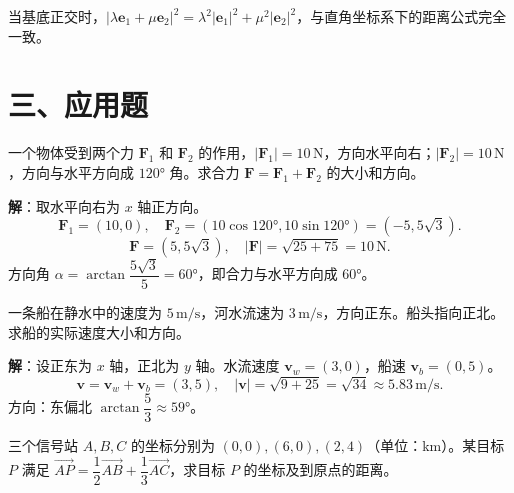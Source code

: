 \documentclass[12pt, a4paper]{ctexart}
\begin{document}
\begin{tipbox}[规律总结]
当基底正交时，$|\lambda\boldsymbol{e}_1+\mu\boldsymbol{e}_2|^2=\lambda^2|\boldsymbol{e}_1|^2+\mu^2|\boldsymbol{e}_2|^2$，与直角坐标系下的距离公式完全一致。
\end{tipbox}

\section*{\textcolor{apppurple}{三、应用题}}

\begin{appbox}[【应用1】力学中的向量分解]
一个物体受到两个力 $\boldsymbol{F}_1$ 和 $\boldsymbol{F}_2$ 的作用，$|\boldsymbol{F}_1|=10\,\text{N}$，方向水平向右；$|\boldsymbol{F}_2|=10\,\text{N}$，方向与水平方向成 $120°$ 角。求合力 $\boldsymbol{F}=\boldsymbol{F}_1+\boldsymbol{F}_2$ 的大小和方向。
\end{appbox}

\noindent\textbf{解}：取水平向右为 $x$ 轴正方向。
\[
  \boldsymbol{F}_1=(10,0),\quad \boldsymbol{F}_2=(10\cos120°,10\sin120°)=(-5,5\sqrt{3}).
\]
\[
  \boldsymbol{F}=(5,5\sqrt{3}),\quad |\boldsymbol{F}|=\sqrt{25+75}=10\,\text{N}.
\]
方向角 $\alpha=\arctan\dfrac{5\sqrt{3}}{5}=60°$，即合力与水平方向成 $60°$。

\vspace{6pt}

\begin{appbox}[【应用2】速度的正交分解]
一条船在静水中的速度为 $5\,\text{m/s}$，河水流速为 $3\,\text{m/s}$，方向正东。船头指向正北。求船的实际速度大小和方向。
\end{appbox}

\noindent\textbf{解}：设正东为 $x$ 轴，正北为 $y$ 轴。水流速度 $\boldsymbol{v}_w=(3,0)$，船速 $\boldsymbol{v}_b=(0,5)$。
\[
  \boldsymbol{v}=\boldsymbol{v}_w+\boldsymbol{v}_b=(3,5),\quad |\boldsymbol{v}|=\sqrt{9+25}=\sqrt{34}\approx5.83\,\text{m/s}.
\]
方向：东偏北 $\arctan\dfrac{5}{3}\approx59°$。

\vspace{6pt}

\begin{appbox}[【应用3】向量与信号定位]
三个信号站 $A,B,C$ 的坐标分别为 $(0,0),(6,0),(2,4)$（单位：km）。某目标 $P$ 满足 $\overrightarrow{AP}=\dfrac{1}{2}\overrightarrow{AB}+\dfrac{1}{3}\overrightarrow{AC}$，求目标 $P$ 的坐标及到原点的距离。
\end{appbox}
\end{document}
